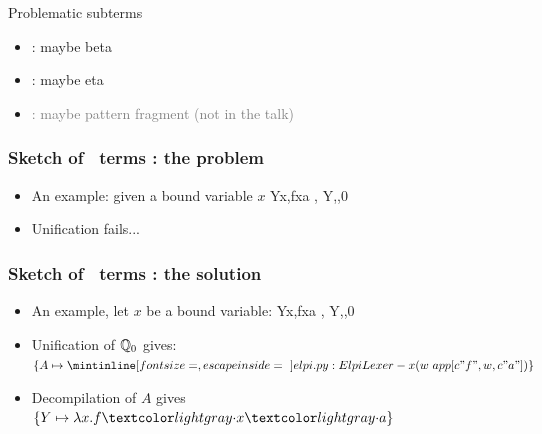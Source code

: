 \documentclass{pres}
\begin{document}
\begin{frame}

  \vspace{10pt}
  \centering
  { Problematic subterms}

  \vspace{10pt}
  \begin{itemize}
    \item \maybebeta: maybe beta
    \item \maybeeta: maybe eta
    \item \textcolor{gray}{\maybelam: maybe pattern fragment (not in the talk)}
  \end{itemize}

\end{frame}

\begin{frame}[fragile]
  \frametitle{Sketch of \maybebeta\ terms : the problem}

  \def\var{Y}

  \begin{itemize}
    \item An example: given a bound variable $x$
      \printAlllSingle
      {{{\var\appsep x,f\appsep x\appsep a}}}
      {{{,}}}
      {{{\var,,0}}}
      {{}}
    \item Unification fails...
  \end{itemize}

\end{frame}

\begin{frame}[fragile]
  \frametitle{Sketch of \maybebeta\ terms : the solution}

  \def\var{Y}

  \begin{itemize}
    \item An example, let $x$ be a bound variable: 
      \printAlllSingle
      {{{\var\appsep x,f\appsep x\appsep a}}}
      {{{,}}}
      {{{\var,,0}}}
      {{}}
    \item Unification of $\mathbb{Q}_0$ gives: $\{A \mapsto \elpiIn{(w\ app[c"f", w, c"a"])}\}$
    \item Decompilation of $A$ gives $\{\var \mapsto \lambda x.f\appsep x\appsep a\}$
  \end{itemize}

\end{frame}
\end{document}
